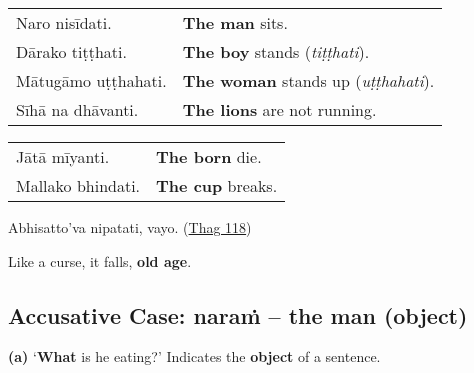 \documentclass[11pt,oneside]{memoir}
\begin{document}
\bigskip

\begin{widecols}


\begin{center}
\begin{tabular}{ll}
Naro nisīdati. & \textbf{The man} sits.\\[0pt]
Dārako tiṭṭhati. & \textbf{The boy} stands (\emph{tiṭṭhati}).\\[0pt]
Mātugāmo uṭṭhahati. & \textbf{The woman} stands up (\emph{uṭṭhahati}).\\[0pt]
Sīhā na dhāvanti. & \textbf{The lions} are not running.\\[0pt]
\end{tabular}
\end{center}

\columnbreak

\begin{center}
\begin{tabular}{ll}
Jātā mīyanti. & \textbf{The born} die.\\[0pt]
Mallako bhindati. & \textbf{The cup} breaks.\\[0pt]
\end{tabular}
\end{center}

{\centering

Abhisatto'va nipatati, vayo. (\href{https://suttacentral.net/thag1.118/pli/ms}{Thag 118})

Like a curse, it falls, \textbf{old age}.

\par}
\end{widecols}

\clearpage

\subsection{Accusative Case: naraṁ -- the man (object)}
\label{sec:orgc88e575}

\textbf{(a)} `\textbf{What} is he eating?' Indicates the \textbf{object} of a sentence.

\renewcommand{\arraystretch}{1.8}
\end{document}
